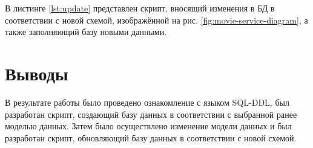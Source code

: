 В листинге \ref{lst:update} представлен скрипт, вносящий изменения в БД в соответствии с новой схемой, изображённой на рис. \ref{fig:movie-service-diagram}, а также заполняющий базу новыми данными.



\section{Выводы}

В результате работы было проведено ознакомление с языком SQL-DDL, был разработан скрипт, создающий базу данных в соответствии с выбранной ранее моделью данных. Затем было осуществлено изменение модели данных и был разработан скрипт, обновляющий базу данных в соответствии с новой схемой.


